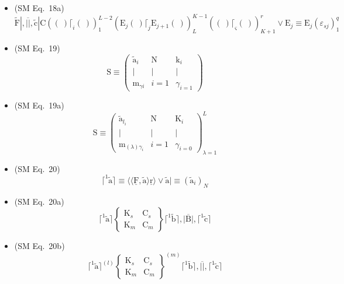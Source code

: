 \documentclass[12pt]{article}
\begin{document}
\begin{itemize}[label={},leftmargin=0pt]
    \item (SM Eq.\ 18a) 
    \[
    \tilde{\mathrm{F}}|, \overline{||}, \tilde{\mathrm{c}}| \mathrm{C} \left( (\ ) \lceil_i (\ ) \right)_1^{L-2} \left( \mathrm{E}_j (\ ) \lceil_j \mathrm{E}_{j+1} (\ ) \right)_L^{K-1} \left( (\ ) \lceil_\varsigma (\ ) \right)_{K+1}^r \lor \mathrm{E}_j \equiv \mathrm{E}_j(\varepsilon_{sj})_1^q
    \]

    \item (SM Eq.\ 19) 
    \[
    \mathrm{S} \equiv \begin{pmatrix} \tilde{\mathrm{a}}_i & \mathrm{N} & \mathrm{k}_i \\ | & | & | \\ \mathrm{m}_{\gamma i} & i=1 & \gamma_{i=1} \end{pmatrix}
    \]

    \item (SM Eq.\ 19a) 
    \[
    \mathrm{S} \equiv \begin{pmatrix} \tilde{\mathrm{a}}_{l_i} & \mathrm{N} & \mathrm{K}_i \\ | & | & | \\ \mathrm{m}_{(\lambda)\gamma_i} & i=1 & \gamma_{i=0} \end{pmatrix}_{\lambda=1}^L
    \]

    \item (SM Eq.\ 20) 
    \[
    \lceil^1 \tilde{\mathrm{a}} \rceil \equiv \langle\langle \underline{\mathrm{F}}, \tilde{\mathrm{a}} \rangle \underline{\mathrm{r}} \rangle \lor \tilde{\mathrm{a}}| \equiv (\tilde{\mathrm{a}}_i)_N
    \]

    \item (SM Eq.\ 20a) 
    \[
    \lceil^1 \tilde{\mathrm{a}} \rceil \left\{ \begin{smallmatrix} \mathrm{K}_s & \mathrm{C}_s \\ \mathrm{K}_m & \mathrm{C}_m \end{smallmatrix} \right\} \lceil^1 \tilde{\mathrm{b}} \rceil, \overline{|\mathrm{B}|}, \lceil^1 \tilde{\mathrm{c}} \rceil
    \]

    \item (SM Eq.\ 20b) 
    \[
    \lceil^1 \tilde{\mathrm{a}} \rceil^{(l)} \left\{ \begin{smallmatrix} \mathrm{K}_s & \mathrm{C}_s \\ \mathrm{K}_m & \mathrm{C}_m \end{smallmatrix} \right\}^{(m)} \lceil^1 \tilde{\mathrm{b}} \rceil, \overline{||}, \lceil^1 \tilde{\mathrm{c}} \rceil
    \]


\end{itemize}
\end{document}
